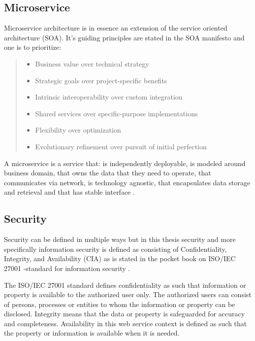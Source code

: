 \subsection{Microservice}
\begin{sloppypar}
    Microservice architecture is in essence an extension of the service oriented 
    architecture (SOA). It's guiding principles are stated in the SOA manifesto 
    \citep{soamanifesto} and one is to prioritize:
    \begin{quotation}
        \noindent \it
        \begin{itemize}
            \item Business value over technical strategy
            \item Strategic goals over project-specific benefits 
            \item Intrinsic interoperability over custom integration 
            \item Shared services over specific-purpose implementations 
            \item Flexibility over optimization 
            \item Evolutionary refinement over pursuit of initial perfection
        \end{itemize}
    \end{quotation}
\end{sloppypar}
\begin{sloppypar}
    A microservice is a service that: is independently deployable,
    is modeled around business domain,
    that owns the data that they need to operate,
    that communicates via network,
    is technology agnostic,
    that encapsulates data storage and retrieval and 
    that has stable interface \citep{newman2019}.
\end{sloppypar}

\subsection{Security}
\begin{sloppypar}
    Security can be defined in multiple ways but in this thesis security 
    and more specifically information security is defined as consisting of 
    Confidentiality, Integrity, and Availability (CIA) as is stated in the 
    pocket book on ISO/IEC 27001 -standard for information security \citep{isoiec27001}.
\end{sloppypar}
\begin{sloppypar}
    The ISO/IEC 27001 standard defines confidentiality as such that information 
    or property is available to the authorized user only. The authorized users 
    can consist of persons, processes or entities to whom the information or 
    property can be disclosed. Integrity means that the data or property is 
    safeguarded for accuracy and completeness. Availability in this web service
    context is defined as such that the property or information is available 
    when it is needed.
\end{sloppypar}

